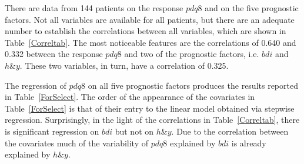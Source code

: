 \documentclass[number,12pt,review]{elsarticle}
\begin{document}
There are data from 144 patients on the response $pdq8$ and on the five prognostic factors. Not all variables are available for all patients, but there are an adequate number to establish the correlations between all variables, which are shown in Table~\ref{Correltab}. The most noticeable features are the correlations of 0.640 and 0.332 between the response $pdq8$ and two of the prognostic factors, i.e. $bdi$ and $h\&y$. These two variables, in turn, have a correlation of 0.325.

\begin{table}[ht]
\end{table}

The regression of $pdq8$ on all five prognostic factors produces the results reported in Table~\ref{ForSelect}.
The order of the appearance of the covariates in Table~\ref{ForSelect} is that
of their entry to the linear model obtained via stepwise regression.
Surprisingly, in the light of the correlations in Table~\ref{Correltab}, there is significant regression on
$bdi$ but not on $h\&y$. Due to the correlation between the covariates much of the variability of $pdq8$ explained by $bdi$ is already explained by $h\&y$.
\end{document}
